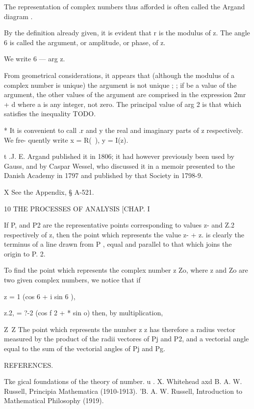 {The representation of complex numbers thus afforded is often called the 
Argand diagram . 

By the definition already given, it is evident that r is the modulus of z. 
The angle 6 is called the argument, or amplitude, or phase, of z. 

We write 6 — arg z. 

From geometrical considerations, it appears that (although the modulus of a complex 
number is unique) the argument is not unique ; ; if   be a value of the argument, the 
other values of the argument are comprised in the expression 2mr + d where a is any 
integer, not zero. The principal value of arg 2 is that which satisfies the inequality 
TODO.

* It is convenient to call .r and y the real and imaginary parts of z respectively. We fre- 
quently write x = R(~), y = I(z). 

t .J. E. Argand published it in 1806; it had however previously been used by Gauss, and 
by Caspar Wessel, who discussed it in a memoir presented to the Danish Academy in 1797 and 
published by that Society in 1798-9. 

X See the Appendix, § A-521. 



10 THE PROCESSES OF ANALYSIS [CHAP. I 

If P, and P2 are the representative points corresponding to values z-  
and Z.2 respectively of z, then the point which represents the value z-  + z.  is 
clearly the terminus of a line drawn from P , equal and parallel to that 
which joins the origin to P. 2. 

To find the point which represents the complex number z Zo, where z   and 
Zo are two given complex numbers, we notice that if 

z  =  1 (cos 6  + i sin 6 ), 

z.2, = ?-2 (cos f 2 + * sin  o) 
then, by multiplication, 

Z\ Z%
The point which represents the number z z  has therefore a radius vector 
measured by the product of the radii vectores of Pj and P2, and a vectorial 
angle equal to the sum of the vectorial angles of Pj and Pg. 

REFERENCES. 

Tke gical foundations of the theory of number. 
u . X. Whitehead axd B. A. W. Russell, Principia Mathematica (1910-1913). 
'B. A. W. Russell, Introduction to Mathematical Philosophy (1919). 

}
